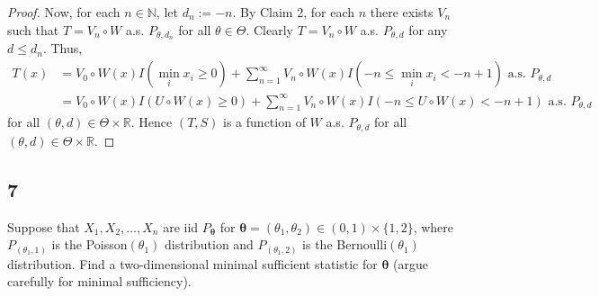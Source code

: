 \documentclass[12pt]{article}
\begin{document}
\begin{enumerate}[label=(\alph*)]
\begin{proof}
      Now, for each $n \in \mathbb{N}$, let $d_n := -n$. By Claim 2, for each $n$ there exists $V_n$ such that $T = V_n\circ W$ a.s. $P_{\theta, d_n}$
      for all $\theta \in \Theta$. Clearly $T = V_n\circ W$ a.s. $P_{\theta, d}$ for any $d \leq d_n$. Thus, 
      \begin{align*}
        T(x) & = V_0\circ W(x) I(\min_i x_i \geq 0) + \sum_{n=1}^{\infty}V_n\circ W(x) I(-n \leq \min_i x_i < -n + 1) \text{ a.s. } P_{\theta, d} \\
        & = V_0\circ W(x) I(U\circ W(x) \geq 0) + \sum_{n=1}^{\infty}V_n\circ W(x) I(-n \leq U\circ W(x) < -n + 1) \text{ a.s. } P_{\theta, d} 
      \end{align*}
      for all $(\theta, d) \in \Theta \times \mathbb{R}$. Hence $(T, S)$ is a function of $W$ a.s. $P_{\theta, d}$ for all $(\theta, d) \in \Theta
      \times \mathbb{R}$.


    \end{proof}

\end{enumerate}



\newpage
\subsection*{7}
\begin{tcolorbox}
  Suppose that $X_1,X_2,\ldots,X_n$ are iid $P_{\bm{\theta}}$ for $\bm{\theta}=(\theta_1,\theta_2)\in(0,1)\times\{1,2\}$, 
  where $P_{(\theta_1,1)}$ is the Poisson$(\theta_1)$ distribution and $P_{(\theta_1,2)}$ is the Bernoulli$(\theta_1)$ distribution.  
  Find a two-dimensional minimal sufficient statistic for $\bm{\theta}$ (argue carefully for minimal sufficiency).
\end{tcolorbox}
\end{document}
